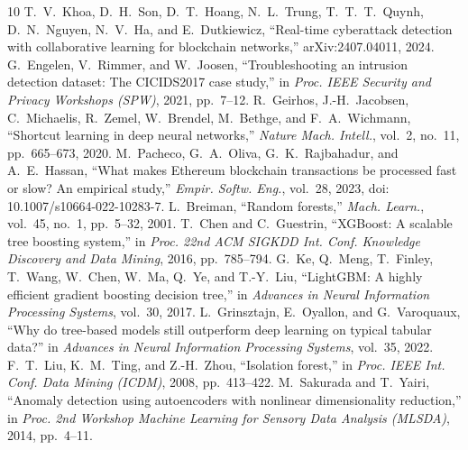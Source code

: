 \documentclass[journal]{IEEEtran}
\begin{document}
\begin{thebibliography}{10}
 T.~V.~Khoa, D.~H.~Son, D.~T.~Hoang, N.~L.~Trung, T.~T.~T.~Quynh, D.~N.~Nguyen, N.~V.~Ha, and E.~Dutkiewicz, ``Real-time cyberattack detection with collaborative learning for blockchain networks,'' arXiv:2407.04011, 2024.
 G.~Engelen, V.~Rimmer, and W.~Joosen, ``Troubleshooting an intrusion detection dataset: The CICIDS2017 case study,'' in \emph{Proc. IEEE Security and Privacy Workshops (SPW)}, 2021, pp.~7--12.
 R.~Geirhos, J.-H.~Jacobsen, C.~Michaelis, R.~Zemel, W.~Brendel, M.~Bethge, and F.~A.~Wichmann, ``Shortcut learning in deep neural networks,'' \emph{Nature Mach. Intell.}, vol.~2, no.~11, pp.~665--673, 2020.
 M.~Pacheco, G.~A.~Oliva, G.~K.~Rajbahadur, and A.~E.~Hassan, ``What makes Ethereum blockchain transactions be processed fast or slow? An empirical study,'' \emph{Empir. Softw. Eng.}, vol.~28, 2023, doi: 10.1007/s10664-022-10283-7.
 L.~Breiman, ``Random forests,'' \emph{Mach. Learn.}, vol.~45, no.~1, pp.~5--32, 2001.
 T.~Chen and C.~Guestrin, ``XGBoost: A scalable tree boosting system,'' in \emph{Proc. 22nd ACM SIGKDD Int. Conf. Knowledge Discovery and Data Mining}, 2016, pp.~785--794.
 G.~Ke, Q.~Meng, T.~Finley, T.~Wang, W.~Chen, W.~Ma, Q.~Ye, and T.-Y.~Liu, ``LightGBM: A highly efficient gradient boosting decision tree,'' in \emph{Advances in Neural Information Processing Systems}, vol.~30, 2017.
 L.~Grinsztajn, E.~Oyallon, and G.~Varoquaux, ``Why do tree-based models still outperform deep learning on typical tabular data?'' in \emph{Advances in Neural Information Processing Systems}, vol.~35, 2022.
 F.~T.~Liu, K.~M.~Ting, and Z.-H.~Zhou, ``Isolation forest,'' in \emph{Proc. IEEE Int. Conf. Data Mining (ICDM)}, 2008, pp.~413--422.
 M.~Sakurada and T.~Yairi, ``Anomaly detection using autoencoders with nonlinear dimensionality reduction,'' in \emph{Proc. 2nd Workshop Machine Learning for Sensory Data Analysis (MLSDA)}, 2014, pp.~4--11.
\end{thebibliography}
\end{document}
